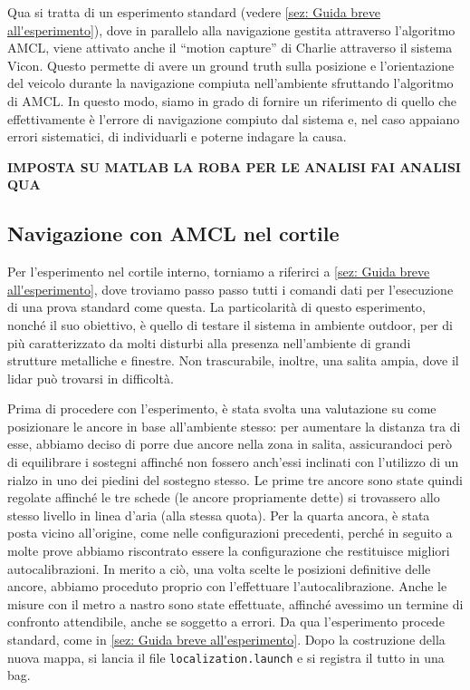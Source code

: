 Qua si tratta di un esperimento standard (vedere \ref{sez: Guida breve all'esperimento}), dove in parallelo alla navigazione gestita attraverso l'algoritmo AMCL, viene attivato anche il ``motion capture''
di Charlie attraverso il sistema Vicon. Questo permette di avere un ground truth sulla posizione e l'orientazione del veicolo durante la navigazione compiuta
nell'ambiente sfruttando l'algoritmo di AMCL. In questo modo, siamo in grado di fornire un riferimento di quello che effettivamente è l'errore di navigazione compiuto dal sistema e, nel caso appaiano errori sistematici, di individuarli e poterne indagare la causa.



\textbf{IMPOSTA SU MATLAB LA ROBA PER LE ANALISI
FAI ANALISI QUA}


\subsection{Navigazione con AMCL nel cortile}
Per l'esperimento nel cortile interno, torniamo a riferirci a \ref{sez: Guida breve all'esperimento}, dove troviamo passo passo tutti i comandi dati per 
l'esecuzione di una prova standard come questa.
La particolarità di questo esperimento, nonché il suo obiettivo, è quello di testare il sistema in ambiente outdoor, per di più caratterizzato da molti disturbi 
alla presenza nell'ambiente di grandi strutture metalliche e finestre. Non trascurabile, inoltre, una salita ampia, dove il lidar può trovarsi in difficoltà.

Prima di procedere con l'esperimento, è stata svolta una valutazione su come posizionare le ancore in base all'ambiente stesso: per aumentare la distanza tra di 
esse, abbiamo deciso di porre due ancore nella zona in salita, assicurandoci però di equilibrare i sostegni affinché non fossero anch'essi inclinati con l'utilizzo 
di un rialzo in uno dei piedini del sostegno stesso. Le prime tre ancore sono state quindi regolate affinché le tre schede (le ancore propriamente dette) si 
trovassero allo stesso livello in linea d'aria (alla stessa quota). Per la quarta ancora, è stata posta vicino all'origine, come nelle configurazioni precedenti, 
perché in seguito a molte prove abbiamo riscontrato essere la configurazione che restituisce migliori autocalibrazioni. In merito a ciò, una volta scelte le 
posizioni definitive delle ancore, abbiamo proceduto proprio con l'effettuare l'autocalibrazione. Anche le misure con il metro a nastro sono state effettuate, 
affinché avessimo un termine di confronto attendibile, anche se soggetto a errori. Da qua l'esperimento procede standard, come in \ref{sez: Guida breve all'esperimento}. 
Dopo la costruzione della nuova mappa, si lancia il file \verb|localization.launch| e si registra il tutto in una bag.

